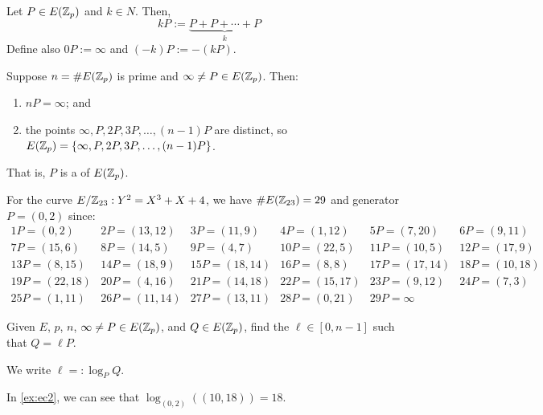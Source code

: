\documentclass[class=co487,tikz,minted,notes]{agony}
\begin{document}
\begin{defn}
  Let $P \in E(\mathbb{Z}_p)$ and $k \in N$. Then,
  \[ kP := \underbrace{P + P + \dotsb + P}_{k} \]
  Define also $0P := \infty$ and $(-k)P := -(kP)$.
\end{defn}

\begin{theorem}
  Suppose $n = \#E(\mathbb{Z}_p)$ is prime and $\infty \neq P \in E(\mathbb{Z}_p)$. Then:
  \begin{enumerate}[nosep]
    \item $nP = \infty$; and
    \item the points $\infty,P,2P,3P,\dotsc,(n-1)P$ are distinct,
          so $E(\mathbb{Z}_p) = \{\infty,P,2P,3P,\dotsc,(n-1)P\}$.
  \end{enumerate}
  That is, $P$ is a  of $E(\mathbb{Z}_p)$.
\end{theorem}

\begin{example}\label{ex:ec2}
  For the curve $E/\mathbb{Z}_{23} : Y^2 = X^3 + X + 4$, we have $\#E(\mathbb{Z}_{23}) = 29$
  and generator $P = (0,2)$ since:
  \[
    \begin{smallmatrix}
      1P = (0,2)  & 2P = (13,12) & 3P = (11,9) & 4P = (1,12)  & 5P = (7,20)  & 6P = (9,11)  \\
      7P = (15,6) & 8P = (14,5)  & 9P = (4,7)  & 10P = (22,5) & 11P = (10,5) & 12P = (17,9) \\
      13P =(8,15) & 14P=(18,9)   & 15P=(18,14) & 16P=(8,8)    & 17P=(17,14)  & 18P=(10,18)  \\
      19P=(22,18) & 20P=(4,16)   & 21P=(14,18) & 22P=(15,17)  & 23P=(9,12)   & 24P=(7,3)    \\
      25P=(1,11)  & 26P=(11,14)  & 27P=(13,11) & 28P=(0,21)   & 29P=\infty
    \end{smallmatrix}
  \]
\end{example}

\begin{problem}
  Given $E$, $p$, $n$, $\infty \neq P \in E(\mathbb{Z}_p)$, and $Q \in E(\mathbb{Z}_p)$,
  find the  $\ell \in [0,n-1]$ such that $Q = \ell P$.

  We write $\ell =: \log_P Q$.
\end{problem}

\begin{example}
  In \cref{ex:ec2}, we can see that $\log_{(0,2)}((10,18)) = 18$.
\end{example}
\end{document}
